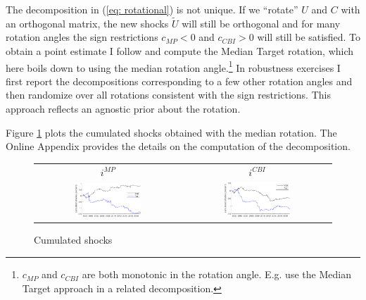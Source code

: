 \documentclass[a4paper,12pt]{article}
\begin{document}
\newcommand{\vsmp}{\frac{\operatorname{var}(i^{MP})}{\operatorname{var}(i^{Total})}}
\newcommand{\vscbi}{\frac{\operatorname{var}(i^{CBI})}{\operatorname{var}(i^{Total})}}

The decomposition in (\ref{eq: rotational}) is not unique. 
If we ``rotate'' $U$ and $C$ with an orthogonal matrix, the new shocks $\tilde{U}$ will still be
orthogonal and for many rotation angles
the sign restrictions $c_{MP}<0$ and $c_{CBI}>0$ will still be satisfied.
To obtain a point estimate I follow \cite{Fry_Pagan_2011} and compute the Median Target rotation, which here boils down to using the median rotation angle.\footnote{$c_{MP}$ and $c_{CBI}$ are both monotonic in the rotation angle.
E.g. \cite{Cieslak_Pang_2020} use the Median Target approach in a related decomposition.} 
In robustness exercises I first report the decompositions corresponding to a few other rotation angles and then randomize over all rotations consistent with the sign restrictions.
This approach reflects an agnostic prior about the rotation.


Figure \ref{fig: cumulated shocks} plots the cumulated shocks obtained with the median rotation.
The Online Appendix provides the details on the computation of the decomposition.


\begin{figure}[!htbp]
\caption{Cumulated shocks}\label{fig: cumulated shocks}
\begin{center}
\begin{tabular}{cc}
\small $i^{MP}$ & \small $i^{CBI}$ \\
\includegraphics[width=0.47\textwidth]{figures/cumulated_mp_median} &
\includegraphics[width=0.47\textwidth]{figures/cumulated_cbi_median}\\
\end{tabular}
\end{center}
\end{figure}
\end{document}
